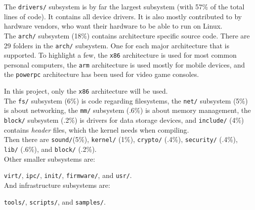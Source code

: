 \documentclass[a4paper,11pt]{report}
\newcommand{\figa}{
    \begin{figure}[!htpb]
    \centering
}
\newcommand{\figb}[2]{
    \caption{#1}
    \label{#2}
    \end{figure}
}
\begin{document}
The \texttt{drivers/} subsystem is by far the largest subsystem (with 57\% of 
the total lines of code). It contains all device drivers. It is also mostly 
contributed to by hardware vendors, who want their hardware to be able to run 
on Linux.
\\

The \texttt{arch/} subsystem (18\%) contains architecture specific source code. 
There are 29 folders in the \texttt{arch/} subsystem. One for each major 
architecture that is supported. To highlight a few, the \texttt{x86} 
architecture is used for most common personal computers, the \texttt{arm} 
architecture is used mostly for mobile devices, and the \texttt{powerpc} 
architecture has been used for video game consoles.

In this project, only the \texttt{x86} architecture will be used.
\\

The \texttt{fs/} subsystem (6\%) is code regarding filesystems, the 
\texttt{net/} subsystem (5\%) is about networking, the \texttt{mm/} 
subsystem (.6\%) is about memory management, the \texttt{block/} subsystem 
(.2\%) is drivers for data storage devices, and \texttt{include/} (4\%) 
contains \emph{header} files, which the kernel needs when 
compiling\cite{linuxorg}.
\\

Then there are \texttt{sound/}(5\%),  \texttt{kernel/} 
(1\%), \texttt{crypto/} (.4\%), \texttt{security/}  (.4\%), \texttt{lib/} 
(.6\%), and \texttt{block/} (.2\%).
\\

Other smaller subsystems are:

\texttt{virt/}, \texttt{ipc/}, \texttt{init/}, \texttt{firmware/}, and \texttt{usr/}.
\\

And infrastructure subsystems are:

\texttt{tools/}, \texttt{scripts/}, and \texttt{samples/}.

\end{document}
